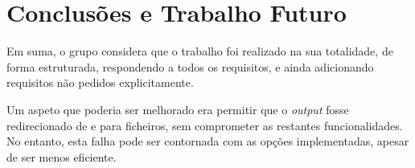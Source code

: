 \documentclass[12pt,a4paper]{report}
\begin{document}
\chapter{Conclusões e Trabalho Futuro}
    Em suma, o grupo considera que o trabalho foi realizado na sua
    totalidade, de forma estruturada, respondendo a todos os requisitos, e ainda
    adicionando requisitos não pedidos explicitamente.

    Um aspeto que poderia ser melhorado era permitir que o \textit{output} fosse
    redirecionado de e para ficheiros, sem comprometer as restantes
    funcionalidades. No entanto, esta falha pode ser contornada com as opções
    implementadas, apesar de ser menos eficiente.
\end{document}

